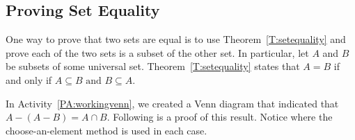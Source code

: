 \subsection*{Proving Set Equality}
One way to prove that two sets are equal 
%
 is to use Theorem~\ref{T:setequality} and prove each of the two sets is a subset of the other set.  In particular,  let  $A$  and  $B$  be subsets of some universal set.  Theorem~\ref{T:setequality} states that  
$A = B$  if and only if  $A \subseteq B\text{  and  }B \subseteq A$.

In \typeu Activity~\ref*{PA:workingvenn}, we created a Venn diagram that indicated that  
\linebreak $A - (A - B) = A \cap B$.  Following is a proof of this result.  Notice where the choose-an-element method is used in each case.

